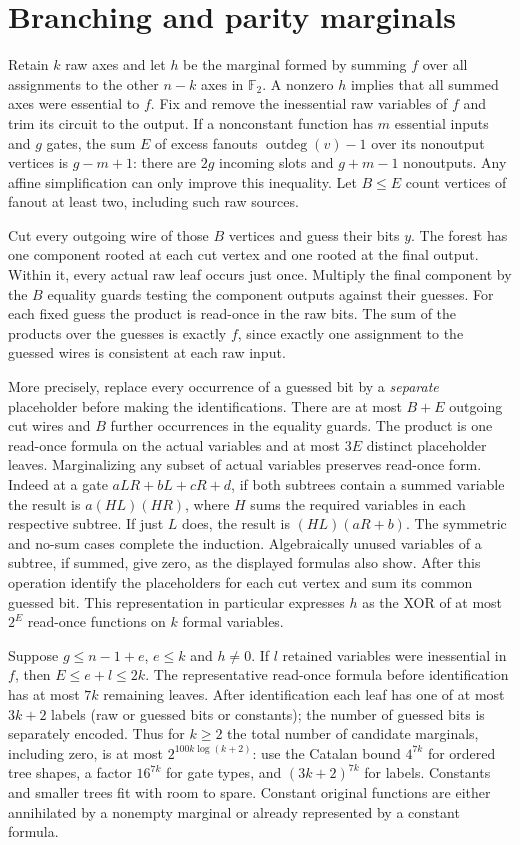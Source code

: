 \documentclass[11pt]{article}
\newcommand{\F}{\mathbb F_2}
\begin{document}
\section{Branching and parity marginals}
Retain $k$ raw axes and let $h$ be the marginal formed by summing $f$ over all assignments to the other $n-k$ axes in $\F$. A nonzero $h$ implies that all summed axes were essential to $f$. Fix and remove the inessential raw variables of $f$ and trim its circuit to the output. If a nonconstant function has $m$ essential inputs and $g$ gates, the sum $E$ of excess fanouts $\operatorname{outdeg}(v)-1$ over its nonoutput vertices is $g-m+1$: there are $2g$ incoming slots and $g+m-1$ nonoutputs. Any affine simplification can only improve this inequality. Let $B\le E$ count vertices of fanout at least two, including such raw sources.

Cut every outgoing wire of those $B$ vertices and guess their bits $y$. The forest has one component rooted at each cut vertex and one rooted at the final output. Within it, every actual raw leaf occurs just once. Multiply the final component by the $B$ equality guards testing the component outputs against their guesses. For each fixed guess the product is read-once in the raw bits. The sum of the products over the guesses is exactly $f$, since exactly one assignment to the guessed wires is consistent at each raw input.

More precisely, replace every occurrence of a guessed bit by a \emph{separate} placeholder before making the identifications. There are at most $B+E$ outgoing cut wires and $B$ further occurrences in the equality guards. The product is one read-once formula on the actual variables and at most $3E$ distinct placeholder leaves. Marginalizing any subset of actual variables preserves read-once form. Indeed at a gate $aLR+bL+cR+d$, if both subtrees contain a summed variable the result is $a(HL)(HR)$, where $H$ sums the required variables in each respective subtree. If just $L$ does, the result is $(HL)(aR+b)$. The symmetric and no-sum cases complete the induction. Algebraically unused variables of a subtree, if summed, give zero, as the displayed formulas also show. After this operation identify the placeholders for each cut vertex and sum its common guessed bit. This representation in particular expresses $h$ as the XOR of at most $2^E$ read-once functions on $k$ formal variables.

Suppose $g\le n-1+e$, $e\le k$ and $h\ne0$. If $l$ retained variables were inessential in $f$, then $E\le e+l\le2k$. The representative read-once formula before identification has at most $7k$ remaining leaves. After identification each leaf has one of at most $3k+2$ labels (raw or guessed bits or constants); the number of guessed bits is separately encoded. Thus for $k\ge2$ the total number of candidate marginals, including zero, is at most $2^{100k\log(k+2)}$: use the Catalan bound $4^{7k}$ for ordered tree shapes, a factor $16^{7k}$ for gate types, and $(3k+2)^{7k}$ for labels. Constants and smaller trees fit with room to spare. Constant original functions are either annihilated by a nonempty marginal or already represented by a constant formula.
\end{document}
